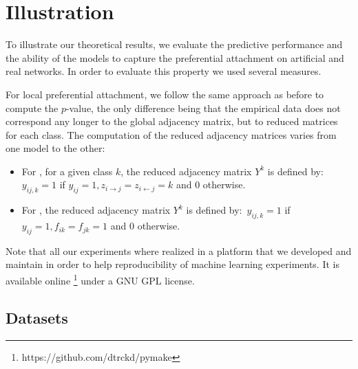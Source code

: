\section{Illustration}
\label{sec:exps}

To illustrate our theoretical results, we evaluate the predictive performance and the ability of the models to capture the preferential attachment on artificial and real networks. In order to evaluate this property we used several measures.




For local preferential attachment, we follow the same approach as before to compute the $p$-value, the only difference being that the empirical data does not correspond any longer to the global adjacency matrix, but to reduced matrices for each class. The computation of the reduced adjacency matrices varies from one model to the other:
%
\begin{itemize}
    \item For \imb, for a given class $k$, the reduced adjacency matrix $Y^k$ is defined by:~$y_{ij,k}=1$ if $y_{ij}=1, z_{i\rightarrow j}=z_{i\leftarrow j}=k$ and $0$ otherwise.
    \item For \ifm, the reduced adjacency matrix $Y^k$ is defined by:~$ y_{ij,k}=1$ if $y_{ij}=1 , f_{ik}=f_{jk}=1$ and $0$ otherwise.
\end{itemize}


Note that all our experiments where realized in a platform that we developed and maintain in order to help reproducibility of machine learning experiments. It is available online \footnote{https://github.com/dtrckd/pymake} under a GNU GPL license.

\subsection{Datasets}

